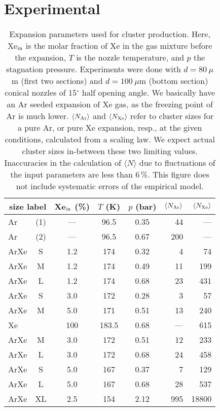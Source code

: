 \section{Experimental}
%
\begin{table*}
\caption{
Expansion parameters used for cluster production. 
Here, Xe$_{\rm in}$ is the molar fraction of Xe in the gas mixture before the expansion, $T$ is the nozzle temperature, and $p$ the stagnation pressure. 
Experiments were done with $d = 80~\mu$m (first two sections) and $d = 100~\mu$m (bottom section) conical nozzles of 15$^\circ$ half opening angle. 
We basically have an Ar seeded expansion of Xe gas, as the freezing point of Ar is much lower. 
$\langle N_{\rm Ar} \rangle$ and $\langle N_{\rm Xe} \rangle$ refer to cluster sizes for a pure Ar, or pure Xe expansion, resp., at the given conditions, calculated from a scaling law.\protect\cite{hagena1981}
We expect actual cluster sizes in-between these two limiting values. 
Inaccuracies in the calculation of $\langle N\rangle$ due to fluctuations of the input parameters are less than 6\,\%. This figure does not include systematic errors of the empirical model.
}
\label{tab:cluster}

\begin{tabular}{l c c c c r r}
%
\toprule
  \multicolumn{2}{r}{size label}  &  Xe$_{\rm in}$ (\%)  &  $T$ (K)  &  $p$ (bar) & $\langle N_{\rm Ar} \rangle$ & $\langle N_{\rm Xe} \rangle$ \\
%
\midrule
Ar & (1) & --- &  96.5  & 0.35  & 44  &  --- \\
Ar & (2) & --- &  96.5  & 0.67  & 200  &  --- \\
ArXe & S & 1.2 &  174   & 0.32  & 4  &   74 \\
ArXe & M & 1.2 &  174   & 0.49  & 11  &  199 \\
ArXe & L & 1.2 &  174   & 0.68  & 23  &  431 \\
ArXe & S & 3.0 &  172   & 0.28  & 3  &   57 \\
ArXe & M & 5.0 &  171   & 0.51  & 13  &  240 \\
Xe &  & 100 & 183.5  & 0.68  & ---  &  615 \\     
\midrule
ArXe & M & 3.0 &  172   & 0.51  & 12  &  233 \\
ArXe & L & 3.0 &  172   & 0.68  & 24  &  458 \\
ArXe & S  & 5.0 &  167  & 0.37  & 7  &  129 \\
ArXe & L  & 5.0 &  167  & 0.68  & 28  &  537 \\
\midrule
ArXe & XL & 2.5 &  154  & 2.12  & 995 & 18800\\
%
\bottomrule
\end{tabular}
\end{table*}

